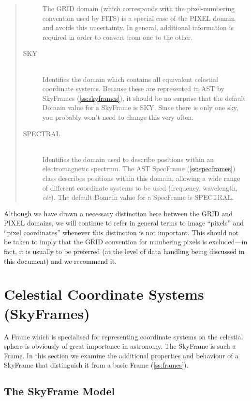 \documentclass[twoside,11pt]{article}
\newcommand{\secref}[1]{\S\ref{#1}}
\renewcommand{\secref}[1]{\ref{#1}}
\begin{document}
\begin{quote}
\begin{description}
The GRID domain (which corresponds with the pixel-numbering convention
used by FITS) is a special case of the PIXEL domain and avoids this
uncertainty. In general, additional information is required in order
to convert from one to the other.

\item[SKY]\mbox{}\\
Identifies the domain which contains all equivalent celestial
coordinate systems. Because these are represented in AST by SkyFrames
(\secref{ss:skyframes}), it should be no surprise that the default
Domain value for a SkyFrame is SKY. Since there is only one sky, you
probably won't need to change this very often.

\item[SPECTRAL]\mbox{}\\
Identifies the domain used to describe positions within an
electromagnetic spectrum. The AST SpecFrame (\secref{ss:specframes})
class describes positions within this domain, allowing a wide range of
different coordinate systems to be used (frequency, wavelength,
{\em{etc}}). The default Domain value for a SpecFrame is SPECTRAL.

\end{description}
\end{quote}

Although we have drawn a necessary distinction here between the GRID
and PIXEL domains, we will continue to refer in general terms to image
``pixels'' and ``pixel coordinates'' whenever this distinction is not
important. This should not be taken to imply that the GRID convention
for numbering pixels is excluded---in fact, it is usually to be
preferred (at the level of data handling being discussed in this
document) and we recommend it.

\cleardoublepage
\section{\label{ss:skyframes}Celestial Coordinate Systems (SkyFrames)}

A Frame which is specialised for representing coordinate systems on
the celestial sphere is obviously of great importance in
astronomy. The SkyFrame is such a Frame. In this section we examine
the additional properties and behaviour of a SkyFrame that distinguish
it from a basic Frame (\secref{ss:frames}).

\subsection{The SkyFrame Model}
\end{document}
